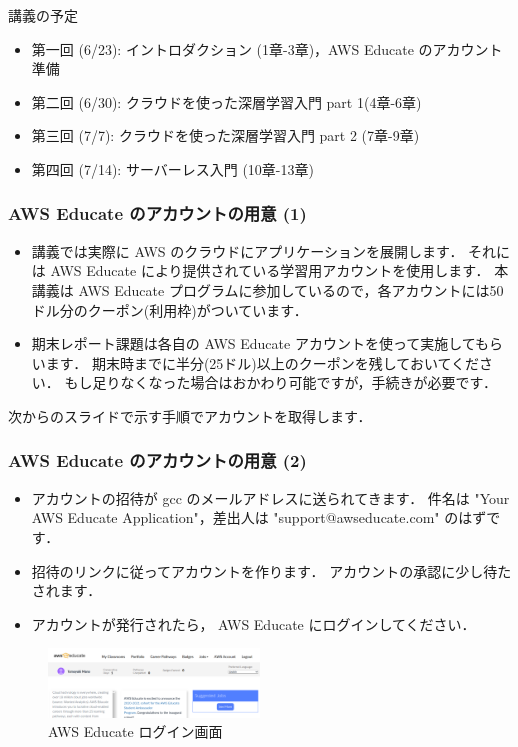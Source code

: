 \documentclass[unicode,11pt]{beamer}
\begin{document}
\begin{frame}{講義の予定}
    \begin{itemize}
        \item 第一回 (6/23): イントロダクション (1章-3章)，AWS Educate のアカウント準備
        \item 第二回 (6/30): クラウドを使った深層学習入門 part 1(4章-6章)
        \item 第三回 (7/7): クラウドを使った深層学習入門 part 2 (7章-9章)
        \item 第四回 (7/14): サーバーレス入門 (10章-13章)
    \end{itemize}
\end{frame}

\begin{frame}
\frametitle{AWS Educate のアカウントの用意 (1)}

\begin{itemize}
    \item 講義では実際に AWS のクラウドにアプリケーションを展開します．
    それには AWS Educate により提供されている学習用アカウントを使用します．
    本講義は AWS Educate プログラムに参加しているので，各アカウントには50ドル分のクーポン(利用枠)がついています．
    \item {\color{red} 期末レポート課題は各自の AWS Educate アカウントを使って実施してもらいます．
    期末時までに半分(25ドル)以上のクーポンを残しておいてください．
    もし足りなくなった場合はおかわり可能ですが，手続きが必要です．}
\end{itemize}

次からのスライドで示す手順でアカウントを取得します．

\end{frame}

\begin{frame}
\frametitle{AWS Educate のアカウントの用意 (2)}
\begin{itemize}
    \item アカウントの招待が gcc のメールアドレスに送られてきます．
    件名は "Your AWS Educate Application"，差出人は "support@awseducate.com" のはずです．
    \item 招待のリンクに従ってアカウントを作ります．
    アカウントの承認に少し待たされます．
    \item アカウントが発行されたら， AWS Educate にログインしてください．
\end{itemize}

\begin{figure}
    \centering
    \includegraphics[width=0.5\textwidth]{imgs/aws_educate_screenshot1.png}
    \caption{AWS Educate ログイン画面}
\end{figure}

\end{frame}
\end{document}
